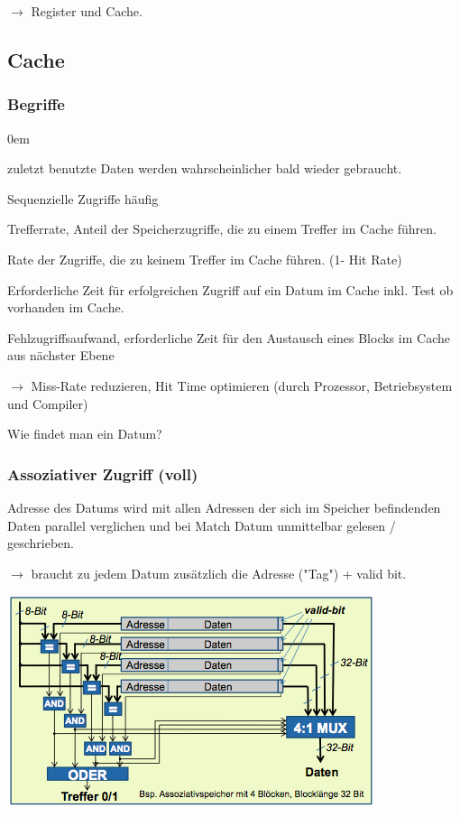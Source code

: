 $\rightarrow$ Register und Cache.


\subsection{Cache}

\subsubsection{Begriffe}
\begin{description}\itemsep0em
\item [Zeitliche Lokalität] zuletzt benutzte Daten werden wahrscheinlicher bald wieder gebraucht.
\item [Räumliche Lokalität] Sequenzielle Zugriffe häufig
\item[Hit Rate] Trefferrate, Anteil der Speicherzugriffe, die zu einem Treffer im Cache führen.
\item[Miss Rate] Rate der Zugriffe, die zu keinem Treffer im Cache führen. (1- Hit Rate)
\item[Hit Time] Erforderliche Zeit für erfolgreichen Zugriff auf ein Datum im Cache inkl. Test ob vorhanden im Cache.
\item[Miss Penalty] Fehlzugriffsaufwand, erforderliche Zeit für den Austausch eines Blocks im Cache aus nächster Ebene
\end{description}
$\rightarrow$ Miss-Rate reduzieren, Hit Time optimieren (durch Prozessor, Betriebsystem und Compiler)

Wie findet man ein Datum?
\subsubsection{Assoziativer Zugriff (voll)}

Adresse des Datums wird mit allen Adressen der sich im Speicher befindenden Daten parallel verglichen und bei Match Datum unmittelbar gelesen / geschrieben.

$\rightarrow$  braucht zu jedem Datum zusätzlich die Adresse ("Tag") + valid bit.

\includegraphics[width=\linewidth]{assozativspeicher.png}

